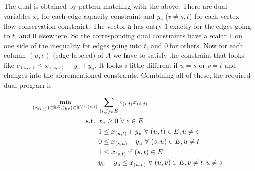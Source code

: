 \begin{enumerate}[label=(\alph*)]
The dual is obtained by pattern matching with the above. There are dual variables $x_{e}$ for each edge capacity constraint and $y_{v}$ ($v\ne s,t$) for each vertex flow-conservation constraint. The vector $\pmb a$ has entry $1$ exactly for the edges going to $t$, and $0$ elsewhere. So the corresponding dual constraints have a scalar $1$ on one side of the inequality for edges going into $t$, and $0$ for others. Now for each column $(u,v)$ (edge-labeled) of $A$ we have to satisfy the constraint that looks like $c_{(u,v)}\le x_{(u,v)} - y_{v}+y_{u}$. It looks a little different if $u=s$ or $v=t$ and changes into the aforementioned constraints. Combining all of these, the required dual program is 

\begin{equation}\label{mincut}\begin{aligned}
\min_{(x_{(i,j)})\in \mathbb{R}^{E}, (y_{v})\in \mathbb{R}^{V\smallsetminus\left\{s,t\right\}}}& \sum_{(i,j)\in E}c_{(i,j)}x_{(i,j)}\\
\text{s.t. }& x_{e}\ge 0~\forall~ e\in E\\
& 1 \le x_{(u,t)} + y_{u} ~\forall~ (u,t)\in E,u\ne s\\ 
& 0\le x_{(s,u)} - y_{u} ~\forall~ (s,u)\in E, u\ne t\\ 
& 1\le x_{(s,t)} \text{ if } (s,t)\in E\\ 
& y_{v}-y_{u}\le x_{(u,v)}~\forall~ (u,v)\in E, v\ne t, u\ne s.
\end{aligned}\end{equation}


\end{enumerate}
